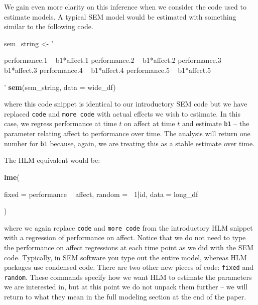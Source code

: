 \documentclass[english,,man]{apa6}
\newenvironment{Shaded}{\begin{snugshade}}{\end{snugshade}}
\newcommand{\DataTypeTok}[1]{\textcolor[rgb]{0.13,0.29,0.53}{#1}}
\newcommand{\DecValTok}[1]{\textcolor[rgb]{0.00,0.00,0.81}{#1}}
\newcommand{\KeywordTok}[1]{\textcolor[rgb]{0.13,0.29,0.53}{\textbf{#1}}}
\newcommand{\NormalTok}[1]{#1}
\newcommand{\OperatorTok}[1]{\textcolor[rgb]{0.81,0.36,0.00}{\textbf{#1}}}
\newcommand{\StringTok}[1]{\textcolor[rgb]{0.31,0.60,0.02}{#1}}
\theoremstyle{definition}
\theoremstyle{definition}
\theoremstyle{definition}
\theoremstyle{remark}
\begin{document}
We gain even more clarity on this inference when we consider the code
used to estimate models. A typical SEM model would be estimated with
something similar to the following code.

\begin{Shaded}
\begin{Highlighting}[]
\NormalTok{sem_string <-}\StringTok{ '}

\StringTok{      performance.1 ~ b1*affect.1}
\StringTok{      performance.2 ~ b1*affect.2}
\StringTok{      performance.3 ~ b1*affect.3}
\StringTok{      performance.4 ~ b1*affect.4}
\StringTok{      performance.5 ~ b1*affect.5}

\StringTok{'}
\KeywordTok{sem}\NormalTok{(sem_string, }\DataTypeTok{data =}\NormalTok{ wide_df)}
\end{Highlighting}
\end{Shaded}

\noindent where this code snippet is identical to our introductory SEM
code but we have replaced \texttt{code} and \texttt{more\ code} with
actual effects we wish to estimate. In this case, we regress performance
at time \(t\) on affect at time \(t\) and estimate \texttt{b1} -- the
parameter relating affect to performance over time. The analysis will
return one number for \texttt{b1} because, again, we are treating this
as a stable estimate over time.

The HLM equivalent would be:

\begin{Shaded}
\begin{Highlighting}[]
\KeywordTok{lme}\NormalTok{(                                   }
  
  \DataTypeTok{fixed =}\NormalTok{ performance }\OperatorTok{~}\StringTok{ }\NormalTok{affect,}
  \DataTypeTok{random =} \OperatorTok{~}\DecValTok{1}\OperatorTok{|}\NormalTok{id,}
  \DataTypeTok{data =}\NormalTok{ long_df}
  
\NormalTok{)}
\end{Highlighting}
\end{Shaded}

\noindent where we again replace \texttt{code} and \texttt{more\ code}
from the introductory HLM snippet with a regression of performance on
affect. Notice that we do not need to type the performance on affect
regressions at each time point as we did with the SEM code. Typically,
in SEM software you type out the entire model, whereas HLM packages use
condensed code. There are two other new pieces of code: \texttt{fixed}
and \texttt{random}. These commands specify how we want HLM to estimate
the parameters we are interested in, but at this point we do not unpack
them further -- we will return to what they mean in the full modeling
section at the end of the paper.
\end{document}
